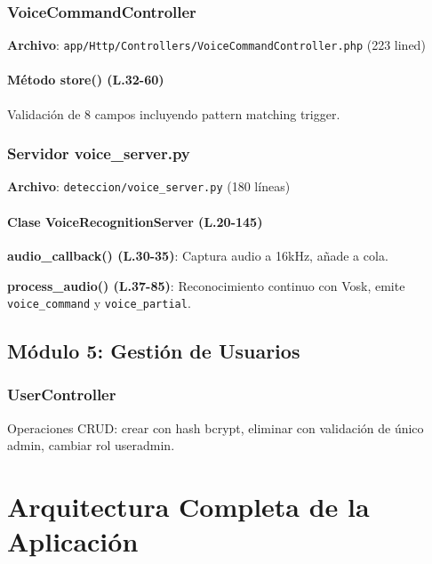 \subsubsection{VoiceCommandController}

\textbf{Archivo}: \texttt{app/Http/Controllers/VoiceCommandController.php} (223 lined)

\paragraph{Método store() (L.32-60)}

Validación de 8 campos incluyendo pattern matching trigger.

\subsubsection{Servidor voice\_server.py}

\textbf{Archivo}: \texttt{deteccion/voice\_server.py} (180 líneas)

\paragraph{Clase VoiceRecognitionServer (L.20-145)}

\textbf{audio\_callback() (L.30-35)}: Captura audio a 16kHz, añade a cola.

\textbf{process\_audio() (L.37-85)}: Reconocimiento continuo con Vosk, emite \texttt{voice\_command} y \texttt{voice\_partial}.

\subsection{Módulo 5: Gestión de Usuarios}

\subsubsection{UserController}

Operaciones CRUD: crear con hash bcrypt, eliminar con validación de único admin, cambiar rol useradmin.

\section{Arquitectura Completa de la Aplicación}


